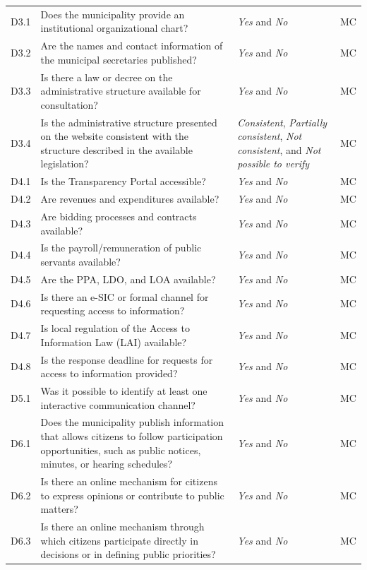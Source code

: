 \documentclass[12pt]{article}
\begin{document}
\begin{longtable}{@{}L{0.09\textwidth}L{0.43\textwidth}L{0.32\textwidth}L{0.10\textwidth}@{}}
D3.1 & Does the municipality provide an institutional organizational chart? & \emph{Yes} and \emph{No} & MC \\
D3.2 & Are the names and contact information of the municipal secretaries published? & \emph{Yes} and \emph{No} & MC \\
D3.3 & Is there a law or decree on the administrative structure available for consultation? & \emph{Yes} and \emph{No} & MC \\
D3.4 & Is the administrative structure presented on the website consistent with the structure described in the available legislation? & \emph{Consistent}, \emph{Partially consistent}, \emph{Not consistent}, and \emph{Not possible to verify} & MC \\
D4.1 & Is the Transparency Portal accessible? & \emph{Yes} and \emph{No} & MC \\
D4.2 & Are revenues and expenditures available? & \emph{Yes} and \emph{No} & MC \\
D4.3 & Are bidding processes and contracts available? & \emph{Yes} and \emph{No} & MC \\
D4.4 & Is the payroll/remuneration of public servants available? & \emph{Yes} and \emph{No} & MC \\
D4.5 & Are the PPA, LDO, and LOA available? & \emph{Yes} and \emph{No} & MC \\
D4.6 & Is there an e-SIC or formal channel for requesting access to information? & \emph{Yes} and \emph{No} & MC \\
D4.7 & Is local regulation of the Access to Information Law (LAI) available? & \emph{Yes} and \emph{No} & MC \\
D4.8 & Is the response deadline for requests for access to information provided? & \emph{Yes} and \emph{No} & MC \\
D5.1 & Was it possible to identify at least one interactive communication channel? & \emph{Yes} and \emph{No} & MC \\
D6.1 & Does the municipality publish information that allows citizens to follow participation opportunities, such as public notices, minutes, or hearing schedules? & \emph{Yes} and \emph{No} & MC \\
D6.2 & Is there an online mechanism for citizens to express opinions or contribute to public matters? & \emph{Yes} and \emph{No} & MC \\
D6.3 & Is there an online mechanism through which citizens participate directly in decisions or in defining public priorities? & \emph{Yes} and \emph{No} & MC \\

\end{longtable}
\end{document}
